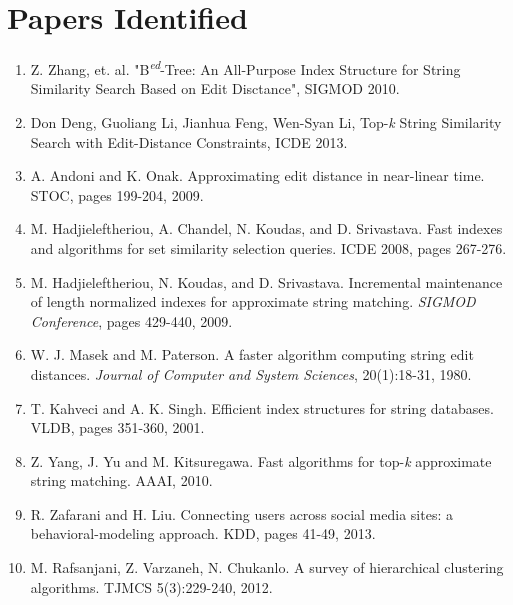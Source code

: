 \documentclass[pdftex,12pt,letter]{article}
\begin{document}
\section{Papers Identified}
\begin{enumerate}
\item Z. Zhang, et. al. "B\textsuperscript{\textit{ed}}-Tree: An All-Purpose Index Structure for String Similarity Search Based on Edit Disctance", SIGMOD 2010.
\item Don Deng, Guoliang Li, Jianhua Feng, Wen-Syan Li, Top-\textit{k} String Similarity Search with Edit-Distance Constraints, ICDE 2013.
\item A. Andoni and K. Onak. Approximating edit distance in near-linear time. STOC, pages 199-204, 2009.
\item M. Hadjieleftheriou, A. Chandel, N. Koudas, and D. Srivastava. Fast indexes and algorithms for set similarity selection queries. ICDE 2008, pages 267-276.
\item M. Hadjieleftheriou, N. Koudas, and D. Srivastava. Incremental maintenance of length normalized indexes for approximate string matching. \textit{SIGMOD Conference}, pages 429-440, 2009.
\item W. J. Masek and M. Paterson. A faster algorithm computing string edit distances. \textit{Journal of Computer and System Sciences}, 20(1):18-31, 1980.
\item T. Kahveci and A. K. Singh. Efficient index structures for string databases. VLDB, pages 351-360, 2001.
\item Z. Yang, J. Yu and M. Kitsuregawa. Fast algorithms for top-\textit{k} approximate string matching. AAAI, 2010.
\item R. Zafarani and H. Liu. Connecting users across social media sites: a behavioral-modeling approach. KDD, pages 41-49, 2013.
\item M. Rafsanjani, Z. Varzaneh, N. Chukanlo. A survey of hierarchical clustering algorithms. TJMCS 5(3):229-240, 2012.

\end{enumerate}
\FloatBarrier
\end{document}

